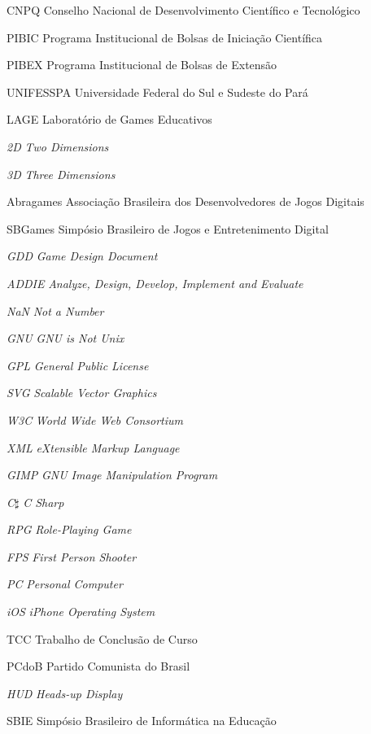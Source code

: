 %
%

\begin{siglas}
	\setlength{\baselineskip}{0.7\baselineskip}
	
	\item[CNPQ] Conselho Nacional de Desenvolvimento Científico e Tecnológico
	\item[PIBIC] Programa Institucional de Bolsas de Iniciação Científica
	\item[PIBEX] Programa Institucional de Bolsas de Extensão
	\item[UNIFESSPA] Universidade Federal do Sul e Sudeste do Pará
    \item[LAGE] Laboratório de Games Educativos
    \item[\textit{2D}] \textit{Two Dimensions}
    \item[\textit{3D}] \textit{Three Dimensions}
    \item[Abragames] Associação Brasileira dos Desenvolvedores de Jogos Digitais
    \item[SBGames] Simpósio Brasileiro de Jogos e Entretenimento Digital
    \item[\textit{GDD}] \textit{Game Design Document}
    \item[\textit{ADDIE}] \textit{Analyze, Design, Develop, Implement and Evaluate}
    \item[\textit{NaN}] \textit{Not a Number}
    \item[\textit{GNU}] \textit{GNU is Not Unix}
    \item[\textit{GPL}] \textit{General Public License}
    \item[\textit{SVG}] \textit{Scalable Vector Graphics}
    \item[\textit{W3C}] \textit{World Wide Web Consortium}
    \item[\textit{XML}] \textit{eXtensible Markup Language}
    \item[\textit{GIMP}] \textit{GNU Image Manipulation Program}
    \item[\textit{C$\sharp$}] \textit{C Sharp}
    \item[\textit{RPG}] \textit{Role-Playing Game}
    \item[\textit{FPS}] \textit{First Person Shooter}
    \item[\textit{PC}] \textit{Personal Computer}
    \item[\textit{iOS}] \textit{iPhone Operating System}
    \item[TCC] Trabalho de Conclusão de Curso
    \item[PCdoB] Partido Comunista do Brasil
    \item[\textit{HUD}] \textit{Heads-up Display}
    \item[SBIE] Simpósio Brasileiro de Informática na Educação
\end{siglas}